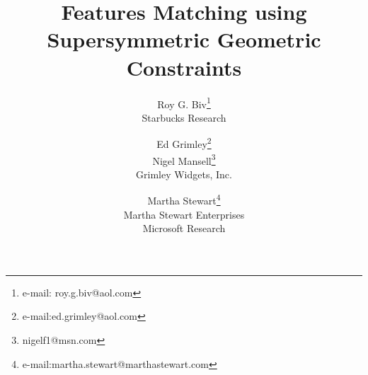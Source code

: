 \documentclass[review]{acmsiggraph}
\title{Features Matching using Supersymmetric Geometric Constraints}
\author{Roy G. Biv\thanks{e-mail: roy.g.biv@aol.com}\\ Starbucks Research %
\and Ed Grimley\thanks{e-mail:ed.grimley@aol.com}\\Nigel Mansell\thanks{nigelf1@msn.com}\\ Grimley Widgets, Inc. %
\and Martha Stewart\thanks{e-mail:martha.stewart@marthastewart.com}\\ Martha Stewart Enterprises \\ Microsoft Research}
\begin{document}

\teaser{
}


\maketitle


\begin{abstract}

\end{abstract}




\keywordlist

\end{document}
